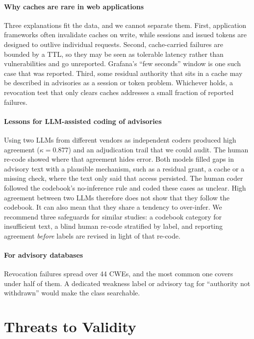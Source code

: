 \documentclass[preprint,12pt]{elsarticle}
\begin{document}
\paragraph{Why caches are rare in web applications}
Three explanations fit the data, and we cannot separate them. First, application frameworks often
invalidate caches on write, while sessions and issued tokens are designed to outlive individual requests. Second,
cache-carried failures are bounded by a TTL, so they may be seen as tolerable latency rather than vulnerabilities and go
unreported. Grafana's ``few seconds'' window is one such case that was reported. Third, some residual authority that sits in a cache may
be described in advisories as a session or token problem. Whichever holds, a revocation test that only clears
caches addresses a small fraction of reported failures.

\paragraph{Lessons for LLM-assisted coding of advisories}
Using two LLMs from different vendors as independent coders produced high agreement
($\kappa=0.877$) and an adjudication trail that we could audit. The human re-code showed where that agreement hides error.
Both models filled gaps in advisory text with a plausible mechanism, such as a residual grant, a cache or a missing check,
where the text only said that access persisted. The human coder followed the codebook's no-inference rule and coded
these cases as unclear. High agreement between two LLMs therefore does not show that they follow the codebook. It can also mean that they
share a tendency to over-infer. We recommend three safeguards for similar studies: a codebook category for
insufficient text, a blind human re-code stratified by label, and reporting agreement \emph{before} labels are revised in
light of that re-code.

\paragraph{For advisory databases}
Revocation failures spread over 44 CWEs, and the most common one covers under half of them. A dedicated
weakness label or advisory tag for ``authority not withdrawn'' would make the class searchable.


\section{Threats to Validity}
\end{document}

